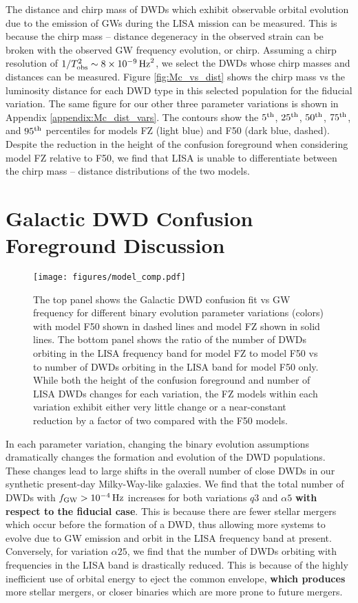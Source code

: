 \documentclass[twocolumn]{aastex631}
\begin{document}
The distance and chirp mass of DWDs which exhibit observable orbital evolution due to the emission of GWs during the LISA mission can be measured. This is because the chirp mass -- distance degeneracy in the observed strain can be broken with the observed GW frequency evolution, or chirp. Assuming a chirp resolution of $1/T_{\rm{obs}}^2 \sim 8\times10^{-9}\,\rm{Hz}^2$, we select the DWDs whose chirp masses and distances can be measured. Figure \ref{fig:Mc_vs_dist} shows the chirp mass vs the luminosity distance for each DWD type in this selected population for the fiducial variation. The same figure for our other three parameter variations is shown in Appendix \ref{appendix:Mc_dist_vars}. The contours show the $5^{\rm{th}}$, $25^{\rm{th}}$, $50^{\rm{th}}$, $75^{\rm{th}}$, and $95^{\rm{th}}$ percentiles for models FZ (light blue) and F50 (dark blue, dashed). Despite the reduction in the height of the confusion foreground when considering model FZ relative to F50, we find that LISA is unable to differentiate between the chirp mass -- distance distributions of the two models. 

\section{Galactic DWD Confusion Foreground Discussion}
\label{sec:model_compare}


\begin{figure}
	\texttt{[image: figures/model\_comp.pdf]}
    \caption{The top panel shows the Galactic DWD confusion fit vs GW frequency for different binary evolution parameter variations (colors) with model F50 shown in dashed lines and model FZ shown in solid lines. The bottom panel shows the ratio of the number of DWDs orbiting in the LISA frequency band for model FZ to model F50 vs to number of DWDs orbiting in the LISA band for model F50 only. While both the height of the confusion foreground and number of LISA DWDs changes for each variation, the FZ models within each variation exhibit either very little change or a  near-constant reduction by a factor of two compared with the F50 models.}
    \label{fig:model_comp}
\end{figure}

In each parameter variation, changing the binary evolution assumptions dramatically changes the formation and evolution of the DWD populations. These changes lead to large shifts in the overall number of close DWDs in our synthetic present-day Milky-Way-like galaxies. We find that the total number of DWDs with $f_{\rm{GW}}>10^{-4}\,\rm{Hz}$ increases for both variations $q3$ and $\alpha5$ \textbf{with respect to the fiducial case}. This is because there are fewer stellar mergers which occur before the formation of a DWD, thus allowing more systems to evolve due to GW emission and orbit in the LISA frequency band at present. Conversely, for variation $\alpha25$, we find that the number of DWDs orbiting with frequencies in the LISA band is drastically reduced. This is because of the highly inefficient use of orbital energy to eject the common envelope, \textbf{which produces} more stellar mergers, or closer binaries which are more prone to future mergers.
\end{document}
